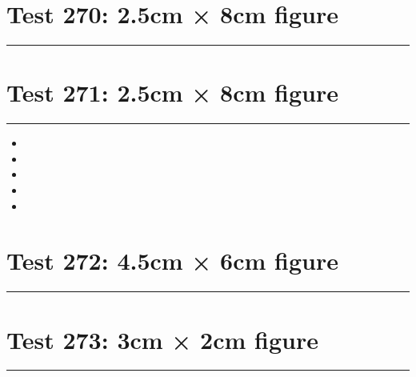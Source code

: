 \documentclass[a4paper,11pt]{article}
\begin{document}
\section*{Test 270: 2.5cm × 8cm figure}
\begin{swarmwrap}%
  \begin{minipage}[t]{2cm}
    \centering
    \rule{\linewidth}{8cm}
  \end{minipage}%
\end{swarmwrap}%
\swarmwrapnext
\lipsum[29]
\lipsum[30]
\lipsum[31]
\lipsum[32]
\lipsum[33]
\lipsum[34]
\section*{Test 271: 2.5cm × 8cm figure}
\begin{swarmwrap}%
  \begin{minipage}[t]{2cm}
    \centering
    \rule{\linewidth}{8cm}
  \end{minipage}%
\end{swarmwrap}
\begin{itemize}
  \item \swarmwrapnext\lipsum[148][1-4]
  \item \lipsum[150][1-3]
  \item \lipsum[1][1-3]
  \item \lipsum[2][1-3]
  \item \lipsum[3][1-3]
\end{itemize}
\section*{Test 272: 4.5cm × 6cm figure}
\begin{swarmwrap}%
  \begin{minipage}[t]{4cm}
    \centering
    \rule{\linewidth}{6cm}
  \end{minipage}%
\end{swarmwrap}%
\swarmwrapnext
\lipsum[103]
\lipsum[104]
\lipsum[105]
\section*{Test 273: 3cm × 2cm figure}
\begin{swarmwrap}%
  \begin{minipage}[t]{3cm}
    \centering
    \rule{\linewidth}{2cm}
  \end{minipage}%
\end{swarmwrap}%
\swarmwrapnext
\lipsum[129]
\lipsum[130]
\lipsum[131]
\end{document}
